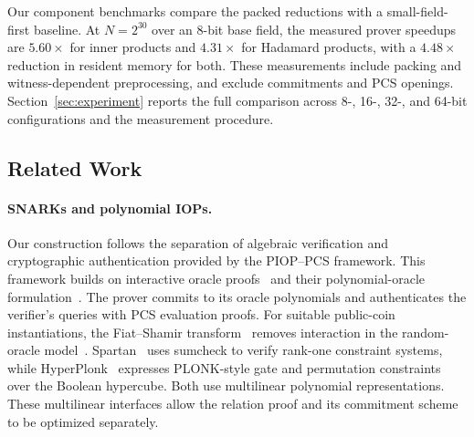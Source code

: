 Our component benchmarks compare the packed reductions with a
small-field-first baseline. At \(N=2^{30}\) over an 8-bit base
field, the measured prover speedups are \(5.60\times\) for inner
products and \(4.31\times\) for Hadamard products, with a
\(4.48\times\) reduction in resident memory for both.
These measurements include packing and witness-dependent
preprocessing, and exclude commitments and PCS openings.
Section~\ref{sec:experiment} reports the full comparison across
8-, 16-, 32-, and 64-bit configurations and the measurement procedure.

\subsection{Related Work}
\label{sec:related-work}

\paragraph{SNARKs and polynomial IOPs.}
Our construction follows the separation of algebraic verification
and cryptographic authentication provided by the PIOP--PCS
framework. This framework builds on interactive oracle
proofs~\cite{tcc/Ben-SassonCS16} and their polynomial-oracle
formulation~\cite{eurocrypt/BunzFS20,eurocrypt/ChiesaHMMVW20}.
The prover commits to its oracle polynomials and authenticates
the verifier's queries with PCS evaluation proofs.
For suitable public-coin instantiations, the
Fiat--Shamir transform~\cite{crypto/FiatS86} removes interaction in
the random-oracle model~\cite{tcc/Ben-SassonCS16,eurocrypt/BunzFS20}.
Spartan~\cite{crypto/Setty20} uses sumcheck to verify rank-one
constraint systems, while HyperPlonk~\cite{eurocrypt/ChenBBZ23}
expresses PLONK-style gate and permutation constraints over the
Boolean hypercube. Both use multilinear polynomial representations.
These multilinear interfaces allow the relation proof and its
commitment scheme to be optimized separately.

